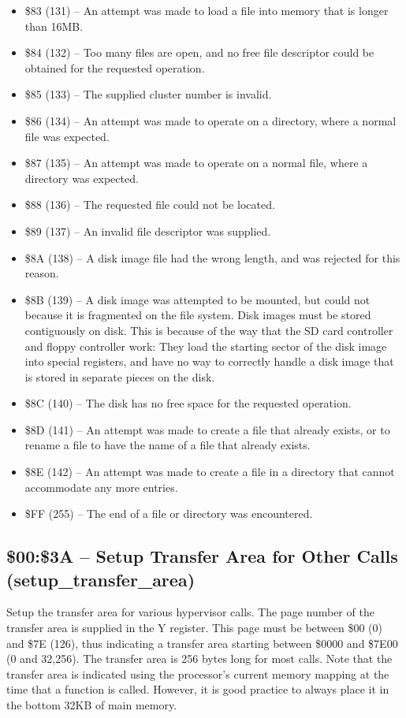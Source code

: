 \begin{itemize}
\item \$83 (131) -- An attempt was made to load a file into memory that is longer than 16MB.
\item \$84 (132) -- Too many files are open, and no free file descriptor could be obtained for the requested operation.
\item \$85 (133) -- The supplied cluster number is invalid.
\item \$86 (134) -- An attempt was made to operate on a directory, where a normal file was expected.
\item \$87 (135) -- An attempt was made to operate on a normal file, where a directory was expected.
\item \$88 (136) -- The requested file could not be located.
\item \$89 (137) -- An invalid file descriptor was supplied.
\item \$8A (138) -- A disk image file had the wrong length, and was rejected for this reason.
\item \$8B (139) -- A disk image was attempted to be mounted, but could not because it is fragmented on the file system.  Disk images must be stored contiguously on disk. This is because of the way that the SD card controller and floppy controller work: They load the starting sector of the disk image into special registers, and have no way to correctly handle a disk image that is stored in separate pieces on the disk. 
\item \$8C (140) -- The disk has no free space for the requested operation.
\item \$8D (141) -- An attempt was made to create a file that already exists, or to rename a file to have the name of a file that already exists.
\item \$8E (142) -- An attempt was made to create a file in a directory that cannot accommodate any more entries.
\item \$FF (255) -- The end of a file or directory was encountered.
\end{itemize}

\subsection{\$00:\$3A -- Setup Transfer Area for Other Calls (setup\_transfer\_area)}

Setup the transfer area for various hypervisor calls. The page number of the transfer area is supplied in the Y register.
This page must be between \$00 (0) and \$7E (126), thus indicating a transfer area starting between \$0000 and \$7E00 (0 and 32,256).
The transfer area is
256 bytes long for most calls.  Note that the transfer area is indicated using the processor's current memory mapping at
the time that a function is called.  However, it is good practice to always place it in the bottom 32KB of main memory.

